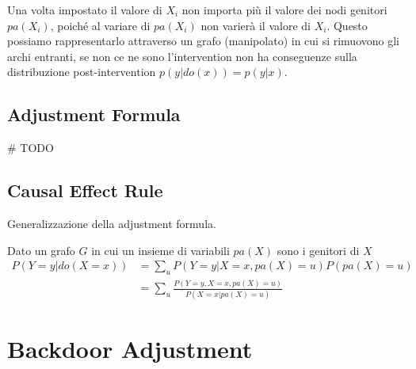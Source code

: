 Una volta impostato il valore di $X_i$ non importa più il valore dei nodi genitori $pa(X_i)$, poiché al variare di $pa(X_i)$ non varierà il valore di $X_i$.
Questo possiamo rappresentarlo attraverso un grafo (manipolato) in cui si rimuovono gli archi entranti, se non ce ne sono l'intervention non ha conseguenze sulla distribuzione post-intervention
$p(y|do(x)) = p(y|x)$.

\subsection*{Adjustment Formula}
\# TODO

\subsection*{Causal Effect Rule}
Generalizzazione della adjustment formula.

Dato un grafo $G$ in cui un insieme di variabili $pa(X)$ sono i genitori di $X$
\begin{align*}
  P(Y=y | do(X=x)) & = \sum_u {P(Y=y | X=x, pa(X)=u) P(pa(X)=u)}              \\
                   & = \sum_u {\frac{P(Y=y, X=x, pa(X)=u)}{P(X=x | pa(X)=u)}}
\end{align*}

\section{Backdoor Adjustment}
